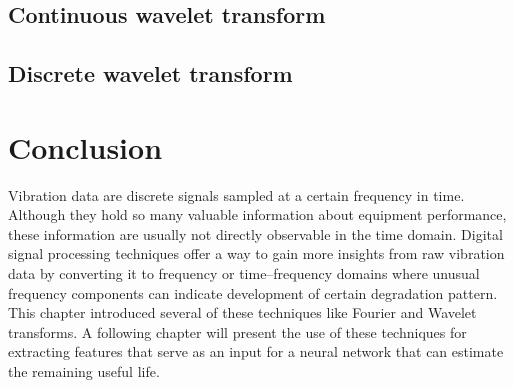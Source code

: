 \subsection{Continuous wavelet transform}

\subsection{Discrete wavelet transform}


\section{Conclusion}
Vibration data are discrete signals sampled at a certain frequency in time. Although they hold so many valuable information about equipment performance, these information are usually not directly observable in the time domain. Digital signal processing techniques offer a way to gain more insights from raw vibration data by converting it to frequency or time–frequency domains where unusual frequency components can indicate development of certain degradation pattern. This chapter introduced several of these techniques like Fourier and Wavelet transforms. A following chapter will present the use of these techniques for extracting features that serve as an input for a neural network that can estimate the remaining useful life.